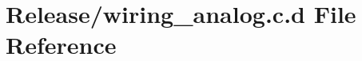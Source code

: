 \hypertarget{_release_2wiring__analog_8c_8d}{\section{\-Release/wiring\-\_\-analog.c.\-d \-File \-Reference}
\label{_release_2wiring__analog_8c_8d}
}
